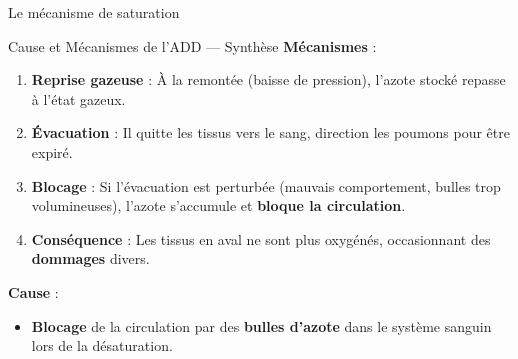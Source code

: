 \begin{frame}{Le mécanisme de saturation}
\end{frame}

\begin{frame}{Cause et Mécanismes de l'ADD — Synthèse}
    \textbf{\textcolor{ffessmred}{Mécanismes}} :
    \begin{enumerate}
        \item \textbf{Reprise gazeuse} : À la remontée (baisse de pression), l'azote stocké repasse à l'état gazeux.
        \item \textbf{Évacuation} : Il quitte les tissus vers le sang, direction les poumons pour être expiré.
        \item \textbf{Blocage} : Si l'évacuation est perturbée (mauvais comportement, bulles trop volumineuses), l'azote s'accumule et \textbf{bloque la circulation}.
        \item \textbf{Conséquence} : Les tissus en aval ne sont plus oxygénés, occasionnant des \textbf{dommages} divers.
    \end{enumerate}

    \vspace{0.8em}

    \textbf{\textcolor{ffessmred}{Cause}} :
    \begin{itemize}
        \item \textbf{Blocage} de la circulation par des \textbf{\textcolor{ffessmred}{bulles d'azote}} dans le système sanguin lors de la désaturation.
    \end{itemize}
\end{frame}

